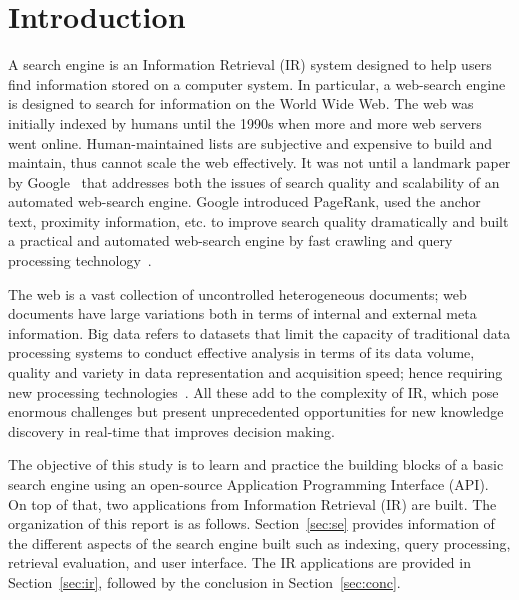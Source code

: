 \documentclass{sig-alternate-05-2015}
\begin{document}

%
%

%
%
\printccsdesc



\section{Introduction}
A search engine is an Information Retrieval (IR) system designed to help users find information stored on a computer system. In particular, a web-search engine is designed to search for information on the World Wide Web. The web was initially indexed by humans until the 1990s when more and more web servers went online. Human-maintained lists are subjective and expensive to build and maintain, thus cannot scale the web effectively. It was not until a landmark paper by Google~\cite{Brin2012} that addresses both the issues of search quality and scalability of an automated web-search engine. Google introduced PageRank, used the anchor text, proximity information, etc. to improve search quality dramatically and built a practical and automated web-search engine by fast crawling and query processing technology~\cite{Brin2012}.  

The web is a vast collection of uncontrolled heterogeneous documents; web documents have large variations both in terms of internal and external meta information. Big data refers to datasets that limit the capacity of traditional data processing systems to conduct effective analysis in terms of its data volume, quality and variety in data representation and acquisition speed; hence requiring new processing technologies~\cite{Chen2014}. All these add to the complexity of IR, which pose enormous challenges but present unprecedented opportunities for new knowledge discovery in real-time that improves decision making. 

The objective of this study is to learn and practice the building blocks of a basic search engine using an open-source Application Programming Interface (API). On top of that, two applications from Information Retrieval (IR) are built. The organization of this report is as follows. Section~\ref{sec:se} provides information of the different aspects of the search engine built such as indexing, query processing, retrieval evaluation, and user interface. The IR applications are provided in Section~\ref{sec:ir}, followed by the conclusion in Section~\ref{sec:conc}.
\end{document}
